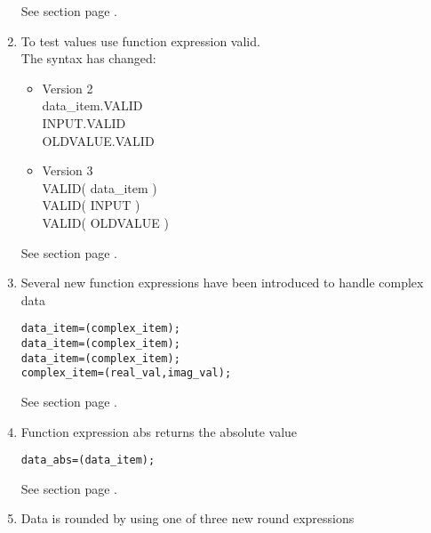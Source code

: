 \begin{enumerate}
See section  page \pageref{fuexpressionsdata}. \\
\item To test values use function expression valid. \\
The syntax has changed:
\begin{itemize}
\item Version 2 \\
data\_item.VALID\\
INPUT.VALID\\
OLDVALUE.VALID\\
\item Version 3 \\
VALID( data\_item )\\
VALID( INPUT )\\
VALID( OLDVALUE )\\
\end{itemize}
See section  page \pageref{fuexpressionsfunctions}. \\
\item Several new function expressions have been introduced to handle complex data

\begin{boxedminipage}[t]{\linewidth}
\begin{alltt}
  data_item = \REAL( complex_item );
  data_item = \IMAG( complex_item );
  data_item = \ARG( complex_item );
  complex_item = \COMPLEX( real_val, imag_val );
\end{alltt}
\end{boxedminipage}

See section  page \pageref{fuexpressionsfunctions}. \\
\item Function expression abs returns the absolute value

\begin{boxedminipage}[t]{\linewidth}
\begin{alltt}
  data_abs = \ABS( data_item );
\end{alltt}
\end{boxedminipage}

See section  page \pageref{fuexpressionsfunctions}. \\
\item Data is rounded by using one of three new round expressions


\end{enumerate}
